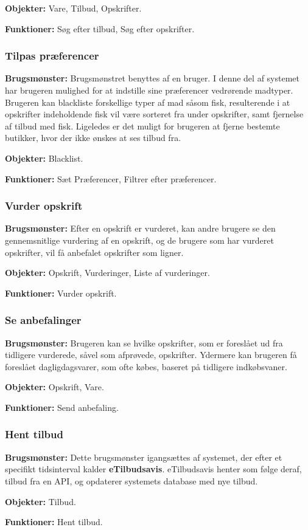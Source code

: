 \textbf{Objekter:} Vare, Tilbud, Opskrifter.

\textbf{Funktioner:} Søg efter tilbud, Søg efter opskrifter.

\subsubsection*{Tilpas præferencer}
\textbf{Brugsmønster:} Brugsmønstret benyttes af en bruger.
I denne del af systemet har brugeren mulighed for at indstille sine præferencer vedrørende madtyper.
Brugeren kan blackliste forskellige typer af mad såsom fisk, resulterende i at opskrifter indeholdende fisk vil være sorteret fra under opskrifter, samt fjernelse af tilbud med fisk.
Ligeledes er det muligt for brugeren at fjerne bestemte butikker, hvor der ikke ønskes at ses tilbud fra.

\textbf{Objekter:} Blacklist.

\textbf{Funktioner:} Sæt Præferencer, Filtrer efter præferencer.

\subsubsection*{Vurder opskrift}
\textbf{Brugsmønster:}
Efter en opskrift er vurderet, kan andre brugere se den gennemsnitlige vurdering af en opskrift, og de brugere som har vurderet opskrifter, vil få anbefalet opskrifter som ligner.

\textbf{Objekter:} Opskrift, Vurderinger, Liste af vurderinger.

\textbf{Funktioner:} Vurder opskrift.

\subsubsection*{Se anbefalinger}
\textbf{Brugsmønster:} Brugeren kan se hvilke opskrifter, som er foreslået ud fra tidligere vurderede, såvel som afprøvede, opskrifter.
Ydermere kan brugeren få foreslået dagligdagsvarer, som ofte købes, baseret på tidligere indkøbsvaner.

\textbf{Objekter:} Opskrift, Vare.

\textbf{Funktioner:} Send anbefaling.

\subsubsection*{Hent tilbud}
\textbf{Brugsmønster:} Dette brugsmønster igangsættes af systemet, der efter et specifikt tidsinterval kalder \textbf{eTilbudsavis}.
eTilbudsavis henter som følge deraf, tilbud fra en API, og opdaterer systemets database med nye tilbud.

\textbf{Objekter:} Tilbud.

\textbf{Funktioner:} Hent tilbud.
